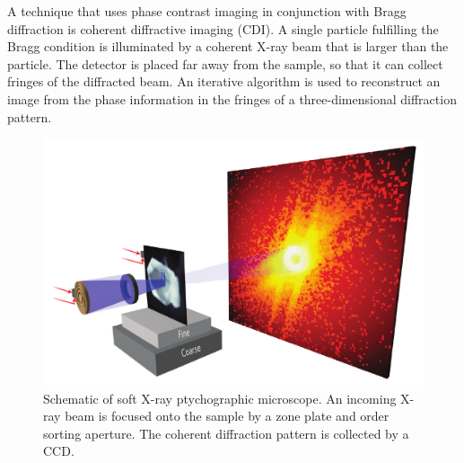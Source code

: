 \documentclass[journal=cmatex,manuscript=perspective]{achemso}
\begin{document}
A technique that uses phase contrast imaging in conjunction with Bragg
diffraction is coherent diffractive imaging (CDI). A single particle
fulfilling the Bragg condition is illuminated by a coherent X-ray beam
that is larger than the particle. The detector is placed far away from
the sample, so that it can collect fringes of the diffracted beam. An
iterative algorithm is used to reconstruct an image from the phase
information in the fringes of a three-dimensional diffraction
pattern\cite{robinson2009}.

\begin{figure}
  \includegraphics[width=\textwidth]{shapiro2014.png}
  \caption{Schematic of soft X-ray ptychographic microscope. An
    incoming X-ray beam is focused onto the sample by a zone plate and
    order sorting aperture. The coherent diffraction pattern is
    collected by a CCD\cite{shapiro2014}.}
  \label{figure:shapiro2014}
\end{figure}
\end{document}
